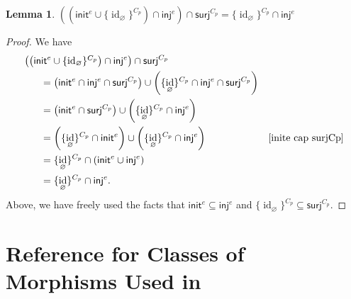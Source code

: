 \documentclass{amsart}
\renewcommand\emptyset\varnothing
\newcommand{\inj}{\mathsf{inj}}
\newcommand{\surj}{\mathsf{surj}}
\newcommand{\init}{\mathsf{init}}
\DeclareMathOperator{\id}{id}
\numberwithin{equation}{section}
\newtheorem{lemma}[equation]{Lemma}
\theoremstyle{definition}
\begin{document}
\begin{lemma}
	\label{((inite cup idemptyCp) cap inje) cap surjCp}
	$\left(\left(\init^e \cup \{\id_\emptyset\}^{C_p}\right) \cap \inj^e \right) \cap \surj^{C_p} = \{\id_\emptyset\}^{C_p} \cap \inj^e$
\end{lemma}
\begin{proof}
	We have
	\begin{align*}
		\rlap{$\left(\left(\init^e \cup \{\id_\emptyset\}^{C_p}\right) \cap \inj^e \right) \cap \surj^{C_p}$}\phantom{xyz} \\
		 & =
		\left(\init^e \cap \inj^e \cap \surj^{C_p} \right)\cup \left(  \{\id_\emptyset\}^{C_p} \cap \inj^e \cap \surj^{C_p} \right)
		\\
		 & =
		\left(\init^e \cap \surj^{C_p} \right) \cup \left(\{\id_\emptyset\}^{C_p} \cap \inj^e \right)
		\\
		 & =
		\left(\{\id_\emptyset\}^{C_p} \cap \init^e \right) \cup \left(\{\id_\emptyset\}^{C_p} \cap \inj^e \right)
		 &
		\text{\cref{inite cap surjCp}}
		\\
		 & =
		\{\id_\emptyset\}^{C_p} \cap \left(\init^e \cup \inj^e\right)
		\\
		 & =
		\{\id_\emptyset\}^{C_p} \cap \inj^e.
	\end{align*}
	Above, we have freely used the facts that $\init^e \subseteq \inj^e$ and $\{\id_\emptyset\}^{C_p} \subseteq \surj^{C_p}$.
\end{proof}

\vfill

\section{Reference for Classes of Morphisms Used in }
\label{fig:cheat sheet}
\end{document}
